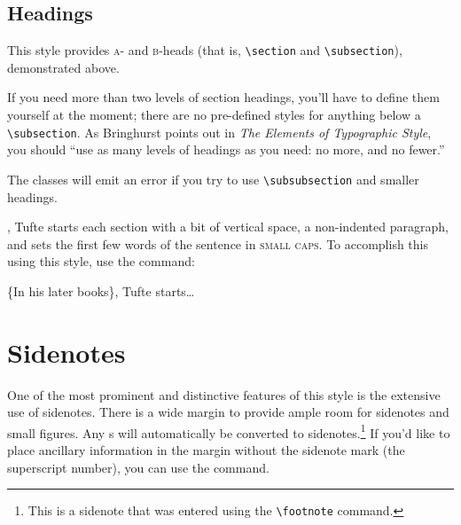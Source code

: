 \subsection{Headings}\label{sec:headings}
This style provides \textsc{a}- and \textsc{b}-heads (that is,
\Verb|\section| and \Verb|\subsection|), demonstrated above.

If you need more than two levels of section headings, you'll have to define
them yourself at the moment; there are no pre-defined styles for anything below
a \Verb|\subsection|.  As Bringhurst points out in \textit{The Elements of
Typographic Style},\cite{Bringhurst2005} you should ``use as many levels of
headings as you need: no more, and no fewer.''

The \TL classes will emit an error if you try to use
\linebreak\Verb|\subsubsection| and smaller headings.

,\cite{Tufte2006} Tufte
starts each section with a bit of vertical space, a non-indented paragraph,
and sets the first few words of the sentence in \textsc{small caps}.  To
accomplish this using this style, use the  command:
\begin{docspec}
  \{In his later books\}, Tufte starts\ldots
\end{docspec}


\section{Sidenotes}\label{sec:sidenotes}
One of the most prominent and distinctive features of this style is the
extensive use of sidenotes.  There is a wide margin to provide ample room
for sidenotes and small figures.  Any s will automatically
be converted to sidenotes.\footnote{This is a sidenote that was entered
using the \texttt{\textbackslash footnote} command.}  If you'd like to place ancillary
information in the margin without the sidenote mark (the superscript
number), you can use the  command.

